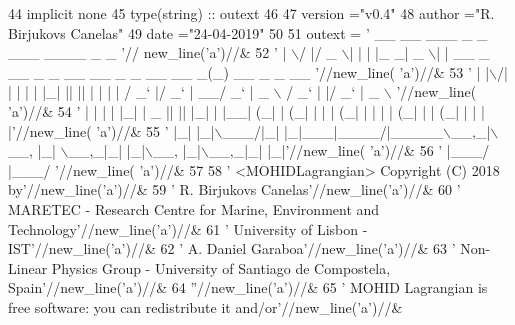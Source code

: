 \begin{DoxyCode}
44     \textcolor{keywordtype}{implicit none}
45     \textcolor{keywordtype}{type}(string) :: outext
46 
47     version  =\textcolor{stringliteral}{"v0.4"}
48     author   =\textcolor{stringliteral}{"R. Birjukovs Canelas"}
49     date     =\textcolor{stringliteral}{"24-04-2019"}
50 
51     outext = \textcolor{stringliteral}{' \_\_  \_\_  \_\_\_  \_   \_ \_\_\_ \_\_\_\_  \_                                      \_              '}//
      new\_line(\textcolor{stringliteral}{'a'})//&
52         \textcolor{stringliteral}{' |  \(\backslash\)/  |/ \_ \(\backslash\)| | | |\_ \_|  \_ \(\backslash\)| |    \_\_ \_  \_\_ \_ \_ \_\_ \_\_ \_ \_ \_\_   \_\_ \_(\_) \_\_ \_ \_ \_\_  '}//new\_line(\textcolor{stringliteral}{
      'a'})//&
53         \textcolor{stringliteral}{' | |\(\backslash\)/| | | | | |\_| || || | | | |   / \_` |/ \_` | \_\_/  \_` |  \_ \(\backslash\) / \_` | |/ \_` |  \_ \(\backslash\) '}//new\_line(\textcolor{stringliteral}{
      'a'})//&
54         \textcolor{stringliteral}{' | |  | | |\_| |  \_  || || |\_| | |\_\_| (\_| | (\_| | | | (\_| | | | | (\_| | | (\_| | | | |'}//new\_line(\textcolor{stringliteral}{
      'a'})//&
55         \textcolor{stringliteral}{' |\_|  |\_|\(\backslash\)\_\_\_/|\_| |\_|\_\_\_|\_\_\_\_/|\_\_\_\_\_\(\backslash\)\_\_,\_|\(\backslash\)\_\_, |\_|  \(\backslash\)\_\_,\_|\_| |\_|\(\backslash\)\_\_, |\_|\(\backslash\)\_\_,\_|\_| |\_|'}//new\_line(\textcolor{stringliteral}{
      'a'})//&
56         \textcolor{stringliteral}{'                                          |\_\_\_/                 |\_\_\_/               '}//new\_line(\textcolor{stringliteral}{
      'a'})//&
57 
58         \textcolor{stringliteral}{'  <MOHIDLagrangian> Copyright (C) 2018 by'}//new\_line(\textcolor{stringliteral}{'a'})//&
59         \textcolor{stringliteral}{'  R. Birjukovs Canelas'}//new\_line(\textcolor{stringliteral}{'a'})//&
60         \textcolor{stringliteral}{'  MARETEC - Research Centre for Marine, Environment and Technology'}//new\_line(\textcolor{stringliteral}{'a'})//&
61         \textcolor{stringliteral}{'  University of Lisbon - IST'}//new\_line(\textcolor{stringliteral}{'a'})//&
62         \textcolor{stringliteral}{'  A. Daniel Garaboa'}//new\_line(\textcolor{stringliteral}{'a'})//&
63         \textcolor{stringliteral}{'  Non-Linear Physics Group - University of Santiago de Compostela, Spain'}//new\_line(\textcolor{stringliteral}{'a'})//&
64         \textcolor{stringliteral}{''}//new\_line(\textcolor{stringliteral}{'a'})//&
65         \textcolor{stringliteral}{'  MOHID Lagrangian is free software: you can redistribute it and/or'}//new\_line(\textcolor{stringliteral}{'a'})//&

\end{DoxyCode}
